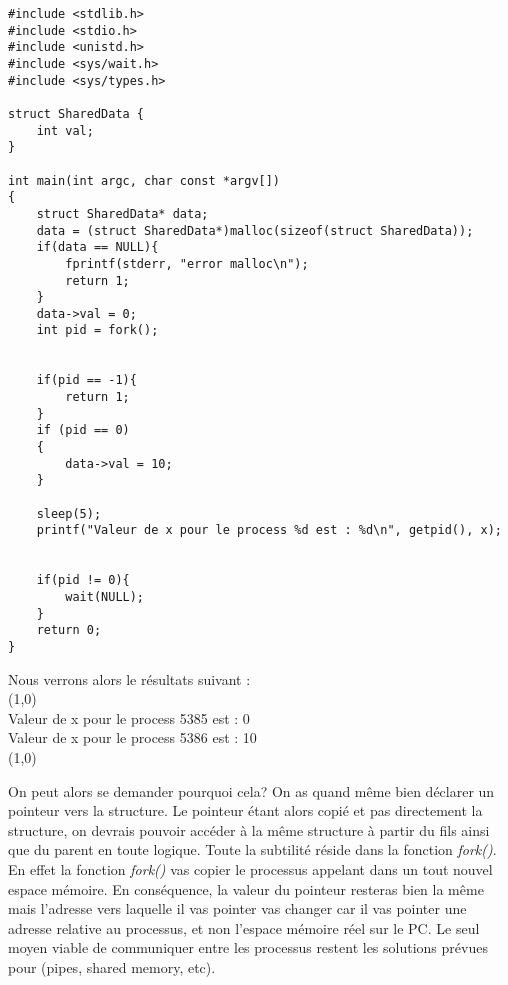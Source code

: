 \begin{lstlisting}[title = Variable pointeur processus]
#include <stdlib.h>
#include <stdio.h>
#include <unistd.h>
#include <sys/wait.h>
#include <sys/types.h>

struct SharedData {
    int val;
}

int main(int argc, char const *argv[])
{
    struct SharedData* data;
    data = (struct SharedData*)malloc(sizeof(struct SharedData));
    if(data == NULL){
        fprintf(stderr, "error malloc\n");
        return 1;
    }
    data->val = 0;
	int pid = fork();

    
	if(pid == -1){
		return 1;
	}
	if (pid == 0)
	{
		data->val = 10;
	}

	sleep(5);
	printf("Valeur de x pour le process %d est : %d\n", getpid(), x);


	if(pid != 0){
		wait(NULL);
	}
	return 0;
}
\end{lstlisting}
\vspace{\baselineskip}

Nous verrons alors le résultats suivant :
\\
\line(1,0){\linewidth}
\\
Valeur de x pour le process 5385 est : 0\\
Valeur de x pour le process 5386 est : 10
\\
\line(1,0){\linewidth}

On peut alors se demander pourquoi cela? On as quand même bien déclarer un pointeur vers la structure. Le pointeur étant alors copié et pas directement la structure, on devrais pouvoir accéder à la même structure à partir du fils ainsi que du parent en toute logique. Toute la subtilité réside dans la fonction \textit{fork()}. En effet la fonction \textit{fork()} vas copier le processus appelant dans un tout nouvel espace mémoire. En conséquence, la valeur du pointeur resteras bien la même mais l'adresse vers laquelle il vas pointer vas changer car il vas pointer une adresse relative au processus, et non l'espace mémoire réel sur le PC. Le seul moyen viable de communiquer entre les processus restent les solutions prévues pour (pipes, shared memory, etc).

